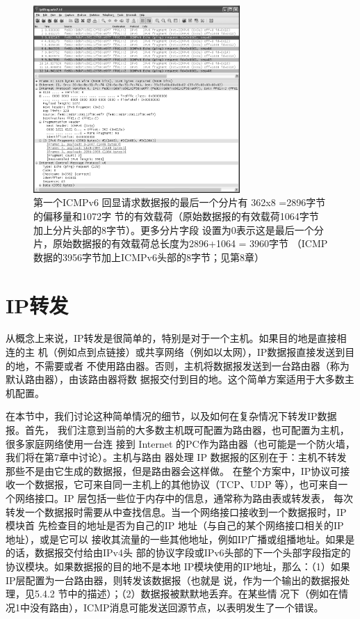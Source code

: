 \begin{figure}[!htb]
    \centering
	\includegraphics[width=0.7\textwidth]{imgs/5/5-15.png}
	\caption{第一个ICMPv6 回显请求数据报的最后一个分片有 362x8 =2896字节的偏移量和1072字
            节的有效载荷（原始数据报的有效载荷1064字节加上分片头部的8字节）。更多分片字段
            设置为0表示这是最后一个分片，原始数据报的有效载荷总长度为2896+1064 = 3960字节
            （ICMP 数据的3956字节加上ICMPv6头部的8字节；见第8章）}
\end{figure}

\section{IP转发}

从概念上来说，IP转发是很简单的，特别是对于一个主机。如果目的地是直接相连的主
机（例如点到点链接）或共享网络（例如以太网），IP数据报直接发送到目的地，不需要或者
不使用路由器。否则，主机将数据报发送到一台路由器（称为默认路由器），由该路由器将数
据报交付到目的地。这个简单方案适用于大多数主机配置。

在本节中，我们讨论这种简单情况的细节，以及如何在复杂情况下转发IP数据报。首先，
我们注意到当前的大多数主机既可配置为路由器，也可配置为主机，很多家庭网络使用一台连
接到 Internet 的PC作为路由器（也可能是一个防火墙，我们将在第7章中讨论）。主机与路由
器处理 IP 数据报的区别在于：主机不转发那些不是由它生成的数据报，但是路由器会这样做。
在整个方案中，IP协议可接收一个数据报，它可来自同一主机上的其他协议（TCP、UDP
等），也可来自一个网络接口。IP 层包括一些位于内存中的信息，通常称为路由表或转发表，
每次转发一个数据报时需要从中查找信息。当一个网络接口接收到一个数据报时，IP模块首
先检查目的地址是否为自己的IP 地址（与自己的某个网络接口相关的IP 地址），或是它可以
接收其流量的一些其他地址，例如IP广播或组播地址。如果是的话，数据报交付给由IPv4头
部的协议字段或IPv6头部的下一个头部字段指定的协议模块。如果数据报的目的地不是本地
IP模块使用的IP地址，那么：（1）如果IP层配置为一台路由器，则转发该数据报（也就是
说，作为一个输出的数据报处理，见5.4.2 节中的描述）；（2）数据报被默默地丢弃。在某些情
况下（例如在情况1中没有路由），ICMP消息可能发送回源节点，以表明发生了一个错误。

